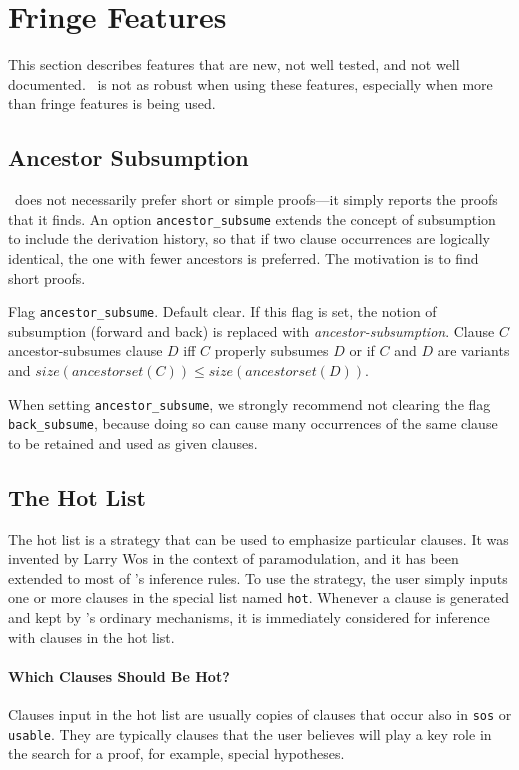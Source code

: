 \documentclass[11pt]{article}
\begin{document}
\section{Fringe Features} \label{fringe}

This section describes features that are new, not well tested,
and not well documented. \otter\ is not as robust when using these
features, especially when more than fringe features is being used.

\subsection{Ancestor Subsumption}

\otter\ does not necessarily prefer short or simple proofs---it
simply reports the proofs that it finds.  An option
\verb:ancestor_subsume: extends the concept of subsumption to
include the derivation history, so that if two clause occurrences
are logically identical, the one with fewer ancestors is preferred.
The motivation is to find short proofs.

\noindent
Flag \verb:ancestor_subsume:.  Default clear.  If this flag is set,
the notion of subsumption (forward and back) is replaced with
{\it ancestor-subsumption}.  Clause $C$ ancestor-subsumes clause
$D$ iff $C$ properly subsumes $D$ or if $C$ and $D$ are variants and
$size(ancestorset(C)) \leq size(ancestorset(D))$.

When setting \verb:ancestor_subsume:, we strongly recommend
not clearing the flag \verb:back_subsume:, because doing so can cause
many occurrences of the same clause to be retained and used as given
clauses.

\subsection{The Hot List} \label{hot}

The hot list is a strategy that can be used to emphasize particular
clauses.  It was invented by Larry Wos in the context of
paramodulation, and it has been extended to most of \otter's
inference rules.  To use the strategy, the user simply inputs
one or more clauses in the special list named \verb:hot:.
Whenever a clause is generated and kept by \otter's ordinary
mechanisms, it is immediately considered for inference with
clauses in the hot list.

\paragraph{Which Clauses Should Be Hot?}
Clauses input in the hot list are usually copies of clauses that occur
also in \verb:sos: or \verb:usable:.  They are typically clauses
that the user believes will play a key role in the search
for a proof, for example, special hypotheses.
\end{document}

